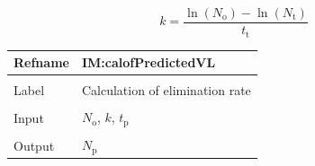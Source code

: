 \documentclass[12pt]{article}
\begin{document}
\begin{displaymath}
k=\frac{\ln\left({N_{\text{o}}}\right)-\ln\left({N_{\text{t}}}\right)}{{t_{\text{t}}}}
\end{displaymath}
\vspace{\baselineskip}
\noindent
\begin{minipage}{\textwidth}
\begin{tabular}{>{\raggedright}p{}>{\raggedright\arraybackslash}p{}}
\toprule \textbf{Refname} & \textbf{IM:calofPredictedVL}
\label{IM:calofPredictedVL}
\\ \midrule \\
Label & Calculation of elimination rate
        
\\ \midrule \\
Input & ${N_{\text{o}}}$, $k$, ${t_{\text{p}}}$
        
\\ \midrule \\
Output & ${N_{\text{p}}}$
         

\end{tabular}
\end{minipage}
\end{document}
